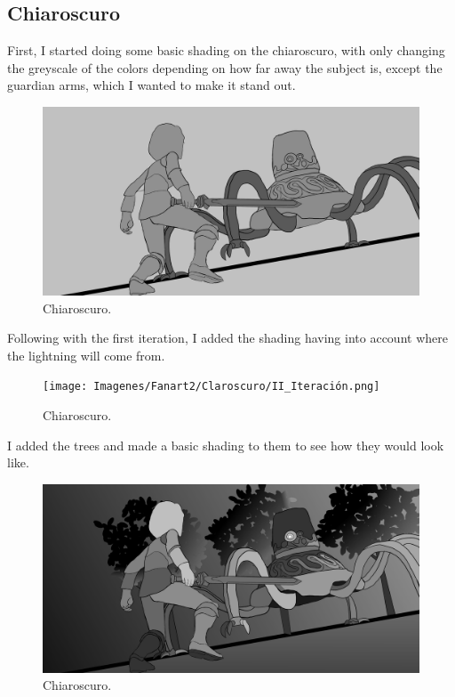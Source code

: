 \documentclass{cup-pan}
\begin{document}
\newpage
    \subsection{Chiaroscuro}

        First, I started doing some basic shading on the chiaroscuro, with only changing the greyscale of the colors depending on how far away the subject is, except the guardian arms, which I wanted to make it stand out. 
        \begin{figure}[H]
            \includegraphics[width=\textwidth]{Imagenes/Fanart2/Claroscuro/I_Iteracion.png}
            \caption{Chiaroscuro.}
        \end{figure}

        Following with the first iteration, I added the shading having into account where the lightning will come from.
        \begin{figure}[H]
            \texttt{[image: Imagenes/Fanart2/Claroscuro/II\_Iteración.png]}
            \caption{Chiaroscuro.}
        \end{figure}

        I added the trees and made a basic shading to them to see how they would look like. 
        \begin{figure}[H]
            \includegraphics[width=\textwidth]{Imagenes/Fanart2/Claroscuro/III_Iteraion.png}
            \caption{Chiaroscuro.}
        \end{figure}
\end{document}
